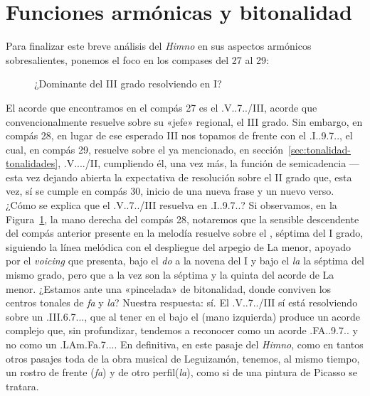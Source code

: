 \section{Funciones armónicas y bitonalidad}
\label{sec:funciones-bitonalidad}

Para finalizar este breve análisis del \emph{Himno} en sus aspectos armónicos sobresalientes, ponemos el foco en los compases del 27 al 29:

\begin{figure}[H]
\centering
{}
\caption{¿Dominante del III grado resolviendo en I?}
\label{fig:V-III}
\end{figure}

El acorde que encontramos en el compás 27 es el \acorde.V..7../III, acorde que convencionalmente resuelve sobre su «jefe» regional, el III grado. Sin embargo, en compás 28, en lugar de ese esperado III nos topamos de frente con el \acorde.I..9.7.., el cual, en compás 29, resuelve sobre el ya mencionado, en sección~\ref{sec:tonalidad-tonalidades}, \acorde.V..../II, cumpliendo él, una vez más, la función de semicadencia ---esta vez dejando abierta la expectativa de resolución sobre el II grado que, esta vez, sí se cumple en compás 30, inicio de una nueva frase y un nuevo verso. ¿Cómo se explica que el \acorde.V..7../III resuelva en \acorde.I..9.7..? Si observamos, en la Figura~\ref{fig:V-III}, la mano derecha del compás 28, notaremos que la sensible descendente  del compás anterior presente en la melodía resuelve sobre el , séptima del I grado, siguiendo la línea melódica con el despliegue del arpegio de La menor, apoyado por el \emph{voicing} que presenta, bajo el \emph{do} a la novena del I y bajo el \emph{la} la séptima del mismo grado, pero que a la vez son la séptima y la quinta del acorde de La menor. ¿Estamos ante una «pincelada» de bitonalidad, donde conviven los centros tonales de \emph{fa} y \emph{la}? Nuestra respuesta: sí. El \acorde.V..7../III sí está resolviendo sobre un \acorde.III.6.7..., que al tener en el bajo el  (mano izquierda) produce un acorde complejo que, sin profundizar, tendemos a reconocer como un acorde \acorde.FA..9.7.. y no como un \acorde.LAm.Fa.7.... En definitiva, en este pasaje del \emph{Himno}, como en tantos otros pasajes toda de la obra musical de Leguizamón, tenemos, al mismo tiempo, un rostro de frente (\emph{fa}) y de otro perfil(\emph{la}), como si de una pintura de Picasso se tratara.
